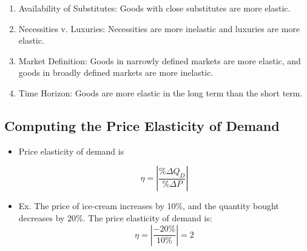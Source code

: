 \begin{enumerate}

	\item Availability of Substitutes: Goods with close substitutes are more elastic.
		
	\item Necessities v. Luxuries: Necessities are more inelastic and luxuries are more elastic.
	
	\item Market Definition: Goods in narrowly defined markets are more elastic, and goods in broadly defined markets are more inelastic.
	
%		
%		
%		
		
	\item Time Horizon: Goods are more elastic in the long term than the short term.
	
%		
%		
%		

\end{enumerate}



\subsection{Computing the Price Elasticity of Demand}

\begin{itemize}

	\item Price elasticity of demand is
	
		 \[ \eta = \left| \frac{\% \Delta Q_D}{\% \Delta P} \right| \]
	 
	 \item Ex. The price of ice-cream increases by 10\%, and the quantity bought decreases by 20\%. The price elasticity of demand is:
	 	\[ \eta = \left| \frac{-20\%}{10\%} \right| = 2 \]

\end{itemize}



